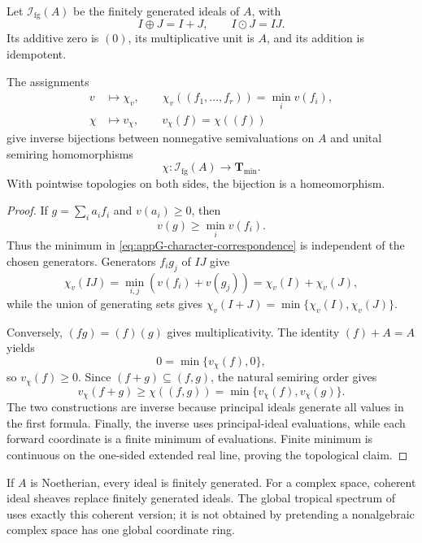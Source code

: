 \begin{definition}
\label{def:appG-ideal-semiring}
Let \(\mathscr I_{\mathrm{fg}}(A)\) be the finitely generated ideals of
\(A\), with
\[
                         I\oplus J=I+J,\qquad
                         I\odot J=IJ.
\tag{G.8}\label{eq:appG-ideal-semiring}
\]
Its additive zero is \((0)\), its multiplicative unit is \(A\), and its
addition is idempotent.
\end{definition}

\begin{theorem}\label{thm:appG-ideal-characters}
The assignments
\[
\begin{aligned}
 v&\longmapsto\chi_v,\qquad
 \chi_v((f_1,\ldots,f_r))=\min_i v(f_i),\\
 \chi&\longmapsto v_\chi,\qquad
 v_\chi(f)=\chi((f))
\end{aligned}
\tag{G.9}\label{eq:appG-character-correspondence}
\]
give inverse bijections between nonnegative semivaluations on \(A\) and
unital semiring homomorphisms
\[
                 \chi:\mathscr I_{\mathrm{fg}}(A)\longrightarrow
                 \mathbf T_{\min}.
\]
With pointwise topologies on both sides, the bijection is a homeomorphism.
\end{theorem}

\begin{proof}
If \(g=\sum_ia_if_i\) and \(v(a_i)\geq0\), then
\[
                           v(g)\geq\min_iv(f_i).
\]
Thus the minimum in \eqref{eq:appG-character-correspondence} is independent
of the chosen generators.
Generators \(f_i g_j\) of \(IJ\) give
\[
 \chi_v(IJ)=\min_{i,j}(v(f_i)+v(g_j))
           =\chi_v(I)+\chi_v(J),
\]
while the union of generating sets gives
\(\chi_v(I+J)=\min\{\chi_v(I),\chi_v(J)\}\).

Conversely,
\((fg)=(f)(g)\) gives multiplicativity.
The identity \((f)+A=A\) yields
\[
                    0=\min\{v_\chi(f),0\},
\]
so \(v_\chi(f)\geq0\).
Since \((f+g)\subseteq(f,g)\), the natural semiring order gives
\[
 v_\chi(f+g)\geq\chi((f,g))
              =\min\{v_\chi(f),v_\chi(g)\}.
\]
The two constructions are inverse because principal ideals generate all
values in the first formula.
Finally, the inverse uses principal-ideal evaluations, while each forward
coordinate is a finite minimum of evaluations.  Finite minimum is
continuous on the one-sided extended real line, proving the topological claim.
\end{proof}

\begin{remark}
\label{rem:appG-coherent-version}
If \(A\) is Noetherian, every ideal is finitely generated.
For a complex space, coherent ideal sheaves replace finitely generated
ideals.
The global tropical spectrum of
 uses exactly this coherent
version; it is not obtained by pretending a nonalgebraic complex space has
one global coordinate ring.
\end{remark}


